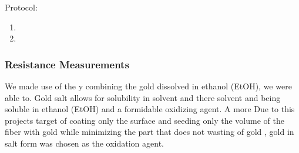 Protocol:

\begin{enumerate}
    \item 
    \item
\end{enumerate}

\subsubsection{Resistance Measurements}

We made use of the 
y combining the gold dissolved in ethanol (EtOH), we were able to. Gold salt allows for solubility in solvent and there solvent and  being soluble in ethanol (EtOH) and a formidable oxidizing agent. A more 
Due to this projects target of coating only the surface and seeding only the volume of the fiber with gold while minimizing the part that does not wasting of gold , gold in salt form was chosen as the oxidation agent.